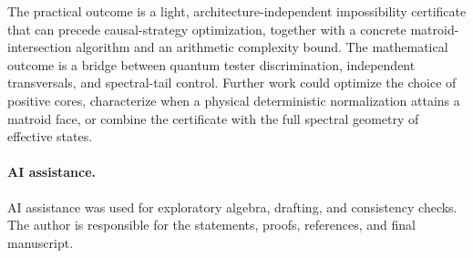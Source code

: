 \documentclass[11pt]{article}
\theoremstyle{definition}
\theoremstyle{remark}
\begin{document}
The practical outcome is a light, architecture-independent impossibility
certificate that can precede causal-strategy optimization, together with a
concrete matroid-intersection algorithm and an arithmetic complexity bound.
The mathematical outcome is a bridge between quantum tester discrimination,
independent transversals, and spectral-tail control.  Further work could
optimize the choice of positive cores, characterize when a physical
deterministic normalization attains a matroid face, or combine the certificate
with the full spectral geometry of effective states.

\paragraph{AI assistance.}
AI assistance was used for exploratory algebra, drafting, and consistency
checks.  The author is responsible for the statements, proofs, references,
and final manuscript.


{\small\sloppy}
\end{document}
